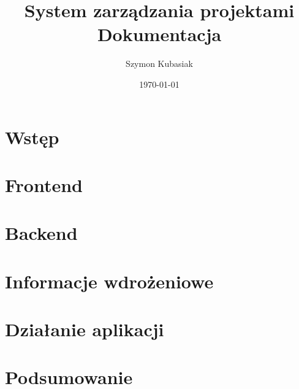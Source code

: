 \documentclass[11pt, titlepage]{article}
\title{System zarządzania projektami\\Dokumentacja}
\author{Szymon Kubasiak}
\date{\today}
\begin{document}
\maketitle

\section{Wstęp}
\section{Frontend}
\section{Backend}
\section{Informacje wdrożeniowe}
\section{Działanie aplikacji}
\section{Podsumowanie}
\end{document}
